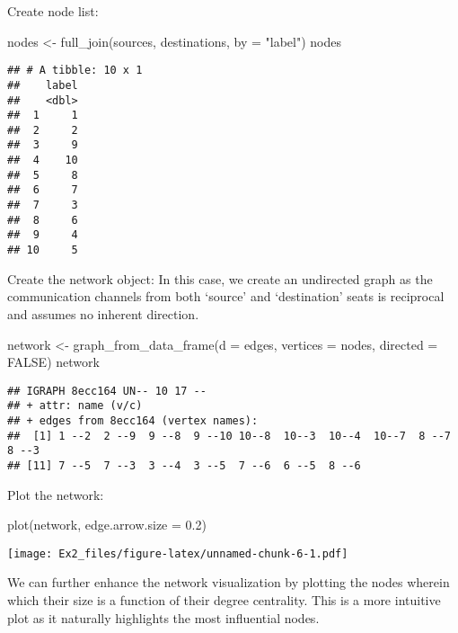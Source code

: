 \documentclass[
]{article}
\newenvironment{Shaded}{\begin{snugshade}}{\end{snugshade}}
\newcommand{\AttributeTok}[1]{\textcolor[rgb]{0.77,0.63,0.00}{#1}}
\newcommand{\ConstantTok}[1]{\textcolor[rgb]{0.00,0.00,0.00}{#1}}
\newcommand{\FloatTok}[1]{\textcolor[rgb]{0.00,0.00,0.81}{#1}}
\newcommand{\FunctionTok}[1]{\textcolor[rgb]{0.00,0.00,0.00}{#1}}
\newcommand{\NormalTok}[1]{#1}
\newcommand{\OtherTok}[1]{\textcolor[rgb]{0.56,0.35,0.01}{#1}}
\newcommand{\StringTok}[1]{\textcolor[rgb]{0.31,0.60,0.02}{#1}}
\begin{document}
Create node list:

\begin{Shaded}
\begin{Highlighting}[]
\NormalTok{nodes }\OtherTok{\textless{}{-}} \FunctionTok{full\_join}\NormalTok{(sources, destinations, }\AttributeTok{by =} \StringTok{"label"}\NormalTok{)}
\NormalTok{nodes}
\end{Highlighting}
\end{Shaded}

\begin{verbatim}
## # A tibble: 10 x 1
##    label
##    <dbl>
##  1     1
##  2     2
##  3     9
##  4    10
##  5     8
##  6     7
##  7     3
##  8     6
##  9     4
## 10     5
\end{verbatim}

Create the network object: In this case, we create an undirected graph
as the communication channels from both `source' and `destination' seats
is reciprocal and assumes no inherent direction.

\begin{Shaded}
\begin{Highlighting}[]
\NormalTok{network }\OtherTok{\textless{}{-}} \FunctionTok{graph\_from\_data\_frame}\NormalTok{(}\AttributeTok{d =}\NormalTok{ edges, }\AttributeTok{vertices =}\NormalTok{ nodes, }\AttributeTok{directed =} \ConstantTok{FALSE}\NormalTok{)}
\NormalTok{network}
\end{Highlighting}
\end{Shaded}

\begin{verbatim}
## IGRAPH 8ecc164 UN-- 10 17 -- 
## + attr: name (v/c)
## + edges from 8ecc164 (vertex names):
##  [1] 1 --2  2 --9  9 --8  9 --10 10--8  10--3  10--4  10--7  8 --7  8 --3 
## [11] 7 --5  7 --3  3 --4  3 --5  7 --6  6 --5  8 --6
\end{verbatim}

Plot the network:

\begin{Shaded}
\begin{Highlighting}[]
\FunctionTok{plot}\NormalTok{(network, }\AttributeTok{edge.arrow.size =} \FloatTok{0.2}\NormalTok{)}
\end{Highlighting}
\end{Shaded}

\texttt{[image: Ex2\_files/figure-latex/unnamed-chunk-6-1.pdf]}

We can further enhance the network visualization by plotting the nodes
wherein which their size is a function of their degree centrality. This
is a more intuitive plot as it naturally highlights the most influential
nodes.
\end{document}
